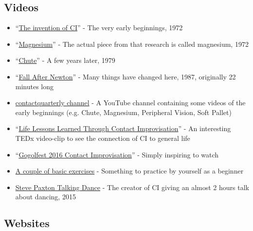 \subsection{Videos}\label{subsec:videos}

\begin{itemize}
    \setlength\itemsep{0em}
    \item ``\href{https://www.youtube.com/watch?v=9FeSDsmIeHA}{The invention of CI}'' - The very early beginnings, 1972
    \item ``\href{https://www.youtube.com/watch?v=5gEfVJBhwrQ}{Magnesium}'' - The actual piece from that research is called magnesium, 1972
    \item ``\href{https://www.youtube.com/watch?v=xKlO-2e3gHo}{Chute}'' - A few years later, 1979
    \item ``\href{https://www.youtube.com/watch?v=k768K\_OTePM}{Fall After Newton}'' - Many things have changed here, 1987, originally 22 minutes long
    \item \href{https://www.youtube.com/@contactquarterly}{contactquarterly channel} - A YouTube channel containing some videos of the early beginnings (e.g. Chute, Magnesium, Peripheral Vision, Soft Pallet)
    \item ``\href{https://www.youtube.com/watch?v=hlIRjfto7o0}{Life Lessons Learned Through Contact Improvisation}'' - An interesting TEDx video-clip to see the connection of CI to general life
    \item ``\href{https://www.youtube.com/watch?v=n1D9RU2GbBo}{Gogolfest 2016 Contact Improvisation}'' - Simply inspiring to watch
    \item \href{https://www.youtube.com/watch?v=H8JiB2Nv5Qo}{A couple of basic exercises} - Something to practice by yourself as a beginner
    \item \href{https://www.youtube.com/watch?v=_82Od5NM4LI}{Steve Paxton Talking Dance} - The creator of CI giving an almost 2 hours talk about dancing, 2015
\end{itemize}

\subsection{Websites}\label{subsec:websites}

